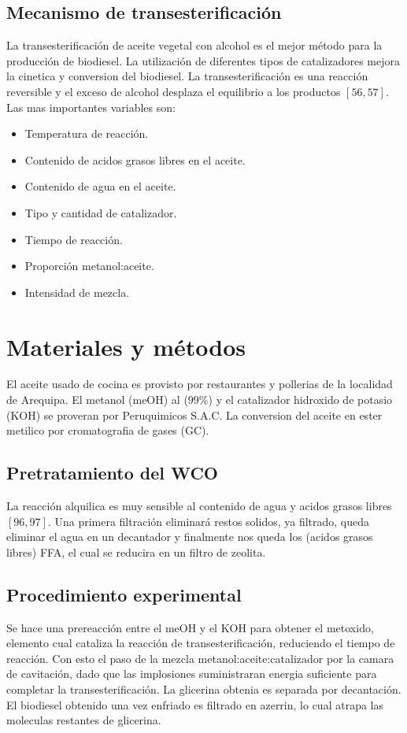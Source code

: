 \documentclass[a4paper,10pt]{article}
\begin{document}
\subsection{Mecanismo de transesterificación}
La transesterificación de aceite vegetal con alcohol es el mejor método para la producción de biodiesel. La utilización de diferentes tipos de catalizadores mejora la cinetica y conversion del biodiesel. La transesterificación es una reacción reversible y el exceso de alcohol desplaza el equilibrio a los productos $[56,57]$. \\
Las mas importantes variables son:
\begin{itemize}
 \item Temperatura de reacción.
 \item Contenido de acidos grasos libres en el aceite.
 \item Contenido de agua en el aceite.
 \item Tipo y cantidad de catalizador.
 \item Tiempo de reacción.
 \item Proporción metanol:aceite.
 \item Intensidad de mezcla.
\end{itemize}

\section{Materiales y métodos}
El aceite usado de cocina es provisto por restaurantes y pollerias de la localidad de Arequipa. El metanol (meOH) al ($99\%$) y el catalizador hidroxido de potasio (KOH) se proveran por Peruquimicos S.A.C. La conversion del aceite en ester metilico por cromatografia de gases (GC).
\subsection{Pretratamiento del WCO}
La reacción alquilica es muy sensible al contenido de agua y acidos grasos libres $[96,97]$. Una primera filtración eliminará restos solidos, ya filtrado, queda eliminar el agua en un decantador y finalmente nos queda los (acidos grasos libres) FFA, el cual se reducira en un filtro de zeolita.
\subsection{Procedimiento experimental}
Se hace una prereacción entre el meOH y el KOH para obtener el metoxido, elemento cual cataliza la reacción de transesterificación, reduciendo el tiempo de reacción.
Con esto el paso de la mezcla metanol:aceite:catalizador por la camara de cavitación, dado que las implosiones suministraran energia suficiente para completar la transesterificación.
La glicerina obtenia es separada por decantación. El biodiesel obtenido una vez enfriado es filtrado en azerrin, lo cual atrapa las moleculas restantes de glicerina. 
\end{document}
